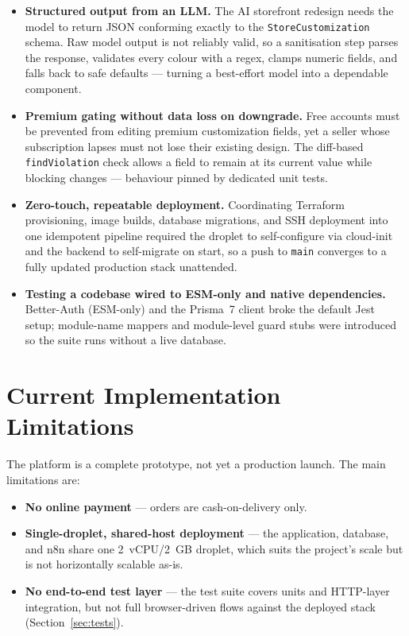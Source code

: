 \documentclass[12pt, a4paper, oneside]{report}
\begin{document}
\begin{itemize}[leftmargin=*,itemsep=3pt]
  \item \textbf{Structured output from an LLM.} The AI storefront
        redesign needs the model to return JSON conforming exactly to
        the \texttt{StoreCustomization} schema. Raw model output is
        not reliably valid, so a sanitisation step parses the
        response, validates every colour with a regex, clamps numeric
        fields, and falls back to safe defaults --- turning a
        best-effort model into a dependable component.
  \item \textbf{Premium gating without data loss on downgrade.} Free
        accounts must be prevented from editing premium customization
        fields, yet a seller whose subscription lapses must not lose
        their existing design. The diff-based \texttt{findViolation}
        check allows a field to remain at its current value while
        blocking changes --- behaviour pinned by dedicated unit tests.
  \item \textbf{Zero-touch, repeatable deployment.} Coordinating
        Terraform provisioning, image builds, database migrations, and
        SSH deployment into one idempotent pipeline required the
        droplet to self-configure via cloud-init and the backend to
        self-migrate on start, so a push to \texttt{main} converges to
        a fully updated production stack unattended.
  \item \textbf{Testing a codebase wired to ESM-only and native
        dependencies.} Better-Auth (ESM-only) and the Prisma~7 client
        broke the default Jest setup; module-name mappers and
        module-level guard stubs were introduced so the suite runs
        without a live database.
\end{itemize}

\section*{Current Implementation Limitations}

The platform is a complete prototype, not yet a production launch.
The main limitations are:

\begin{itemize}[leftmargin=*,itemsep=2pt]
  \item \textbf{No online payment} --- orders are cash-on-delivery
        only.
  \item \textbf{Single-droplet, shared-host deployment} --- the
        application, database, and n8n share one 2~vCPU/2~GB droplet,
        which suits the project's scale but is not horizontally
        scalable as-is.
  \item \textbf{No end-to-end test layer} --- the test suite covers
        units and HTTP-layer integration, but not full
        browser-driven flows against the deployed stack
        (Section~\ref{sec:tests}).
\end{itemize}
\end{document}
